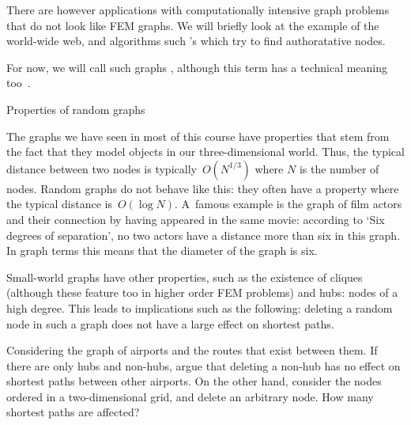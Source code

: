 There are however applications with computationally intensive graph
problems that do not look like \ac{FEM} graphs. We will briefly look
at the example of the world-wide web, and algorithms such
's  which try to find
authoratative nodes.

For now, we will call such graphs ,
although this term has a technical meaning
too~\cite{Erdos:randomgraph}.

 {Properties of random graphs}

The graphs we have seen in most of this course have properties that
stem from the fact that they model objects in our three-dimensional
world. Thus, the typical distance between two nodes is
typically~$O(N^{1/3})$ where $N$ is the number of nodes. Random graphs
do not behave like this: they often have a 
property where the typical distance is~$O(\log N)$. A~famous example
is the graph of film actors and their connection by having appeared in
the same movie: according to `Six degrees of separation', no two actors
have a distance more than six in this graph. In graph terms this means
that the diameter of the graph is six.

Small-world graphs have other properties, such as the existence of
cliques (although these feature too in higher order \ac{FEM} problems)
and hubs: nodes of a high degree. This leads to implications such as
the following: deleting a random node in such a graph does not have a
large effect on shortest paths.

\begin{exercise}
  Considering the graph of airports and the routes that exist between
  them. If there are only hubs and non-hubs, argue that deleting a
  non-hub has no effect on shortest paths between other airports. On
  the other hand, consider the nodes ordered in a two-dimensional
  grid, and delete an arbitrary node. How many shortest paths are affected?
\end{exercise}

